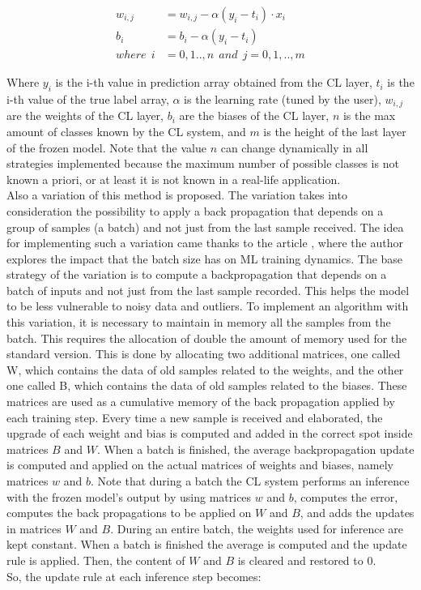 \documentclass[12pt]{report}
\begin{document}
\begin{align}
    w_{i,j} &= w_{i,j} - \alpha (y_i - t_i) \cdot x_i \\
    b_i     &= b_i - \alpha (y_i - t_i) \\
    where \:\: i &= 0,1..,n  \: \: and \: \:  j=0,1,..,m \nonumber 
\end{align}

Where $y_i$ is the i-th value in prediction array obtained from the CL layer, $t_i$ is the i-th value of the true label array, $\alpha$ is the learning rate (tuned by the user), $w_{i,j}$ are the weights of the CL layer, $b_i$ are the biases of the CL layer, $n$ is the max amount of classes known by the CL system, and $m$ is the height of the last layer of the frozen model. Note that the value $n$ can change dynamically in all strategies implemented because the maximum number of possible classes is not known a priori, or at least it is not known in a real-life application. \\
Also a variation of this method is proposed. The variation takes into consideration the possibility to apply a back propagation that depends on a group of samples (a batch) and not just from the last sample received. The idea for implementing such a variation came thanks to the article \cite{batch_size_medium}, where the author explores the impact that the batch size has on ML training dynamics. The base strategy of the variation is to compute a backpropagation that depends on a batch of inputs and not just from the last sample recorded. This helps the model to be less vulnerable to noisy data and outliers. To implement an algorithm with this variation, it is necessary to maintain in memory all the samples from the batch. This requires the allocation of double the amount of memory used for the standard version. This is done by allocating two additional matrices, one called W, which contains the data of old samples related to the weights, and the other one called B, which contains the data of old samples related to the biases. These matrices are used as a cumulative memory of the back propagation applied by each training step. Every time a new sample is received and elaborated, the upgrade of each weight and bias is computed and added in the correct spot inside matrices $B$ and $W$. When a batch is finished, the average backpropagation update is computed and applied on the actual matrices of weights and biases, namely matrices $w$ and $b$. Note that during a batch the CL system performs an inference with the frozen model's output by using matrices $w$ and $b$, computes the error, computes the back propagations to be applied on $W$ and $B$, and adds the updates in matrices $W$ and $B$. During an entire batch, the weights used for inference are kept constant. When a batch is finished the average is computed and the update rule is applied. Then, the content of $W$ and $B$ is cleared and restored to 0. \\
So, the update rule at each inference step becomes:
\end{document}
